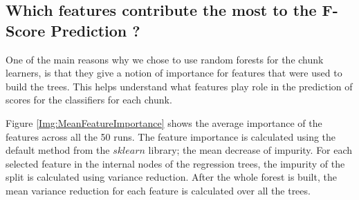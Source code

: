 \subsection{Which features contribute the most to the F-Score Prediction ?}
\label{SubsectionFeature}
One of the main reasons why we chose to use random forests for the chunk learners, is that they give a notion of importance for features that were used to build the trees.
This helps understand what features play role in the prediction of scores for the classifiers for each chunk.

Figure \ref{Img:MeanFeatureImportance} shows the average importance of the features across all the 50 runs.
The feature importance is calculated using the default method from the $sklearn$ library; the mean decrease of impurity.
For each selected feature in the internal nodes of the regression trees, the impurity of the split is calculated using variance reduction.
After the whole forest is built, the mean variance reduction for each feature is calculated over all the trees.

